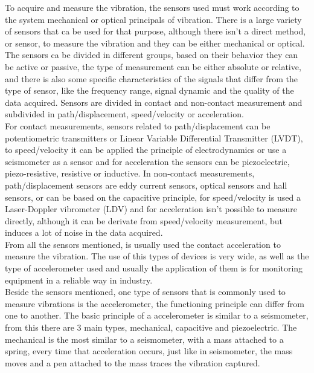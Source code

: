 To acquire and measure the vibration, the sensors used must work according to the system mechanical or optical principals of vibration. There is a large variety of sensors that ca be used for that purpose, although there isn't a direct method, or sensor, to measure the vibration and they can be either mechanical or optical. The sensors ca be divided in different groups, based on their behavior they can be active or passive, the type of measurement can be either absolute or relative, and there is also some specific characteristics of the signals that differ from the type of sensor, like the frequency range, signal dynamic and the quality of the data acquired. Sensors are divided in contact and non-contact measurement and subdivided in path/displacement, speed/velocity or acceleration.\\
For contact measurements, sensors related to path/displacement can be potentiometric transmitters or Linear Variable Differential Transmitter (LVDT), to speed/velocity it can be applied the principle of electrodynamics or use a seismometer as a sensor and for acceleration the sensors can be piezoelectric, piezo-resistive, resistive or inductive. In non-contact measurements, path/displacement sensors are eddy current sensors, optical sensors and hall sensors, or can be based on the capacitive principle, for speed/velocity is used a Laser-Doppler vibrometer (LDV) and for acceleration isn't possible to measure directly, although it can be derivate from speed/velocity measurement, but induces a lot of noise in the data acquired\cite{SensorsVibrationMeasurement}\cite{VibrationMeasurementVibration2019}.\\
From all the sensors mentioned, is usually used the contact acceleration to measure the vibration. The use of this types of devices is very wide, as well as the type of accelerometer used and usually the application of them is for monitoring equipment in a reliable way in industry.\\ 
Beside the sensors mentioned, one type of sensors that is commonly used to measure vibrations is the accelerometer, the functioning principle can differ from one to another. The basic principle of a accelerometer is similar to a seismometer, from this there are 3 main types, mechanical, capacitive and piezoelectric. The mechanical is the most similar to a seismometer, with a mass attached to a spring, every time that acceleration occurs, just like in seismometer, the mass moves and a pen attached to the mass traces the vibration captured.
